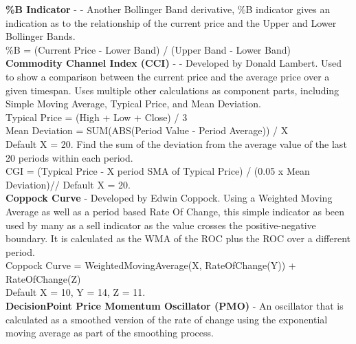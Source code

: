 \documentclass[12pt,a4paper]{article}
\begin{document}
\iffalse
[]
\fi

\noindent
\textbf{\%B Indicator} - \cite{Murphy1999} - Another Bollinger Band derivative, \%B indicator gives an indication as to the relationship of the current price and the Upper and Lower Bollinger Bands. \\

\noindent
\%B = (Current Price - Lower Band) / (Upper Band - Lower Band)\\

\iffalse
[]
\fi

\noindent
\textbf{Commodity Channel Index (CCI)} - \cite{Lambert1980} - Developed by Donald Lambert. Used to show a comparison between the current price and the average price over a given timespan. Uses multiple other calculations as component parts, including Simple Moving Average, Typical Price, and Mean Deviation.\\

\noindent
Typical Price = (High + Low + Close) / 3\\

\noindent
Mean Deviation = SUM(ABS(Period Value - Period Average)) / X\\
Default X = 20. Find the sum of the deviation from the average value of the last 20 periods within each period. \\

\noindent
CGI = (Typical Price - X period SMA of Typical Price) / (0.05 x Mean Deviation)//
Default X = 20.\\

\iffalse
[]
\fi

\noindent
\textbf{Coppock Curve} - Developed by Edwin Coppock. Using a Weighted Moving Average as well as a period based Rate Of Change, this simple indicator as been used by many as a sell indicator as the value crosses the positive-negative boundary. It is calculated as the WMA of the ROC plus the ROC over a different period.\\

\noindent
Coppock Curve = WeightedMovingAverage(X, RateOfChange(Y)) + RateOfChange(Z)\\
Default X = 10, Y = 14, Z = 11. \\

\iffalse
[]
\fi

\noindent
\textbf{DecisionPoint Price Momentum Oscillator (PMO)} - An oscillator that is calculated as a smoothed version of the rate of change using the exponential moving average as part of the smoothing process. \\
\end{document}
